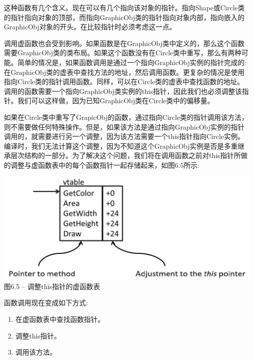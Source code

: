 这种函数有几个含义。现在可以有几个指向该对象的指针。指向Shape或Circle类的指针指向对象的顶部，而指向GraphicObj类的指针指向对象内部，指向嵌入的GraphicObj对象的开头。在比较指针时必须考虑这一点。\par

调用虚函数也会受到影响。如果函数是在GraphicObj类中定义的，那么这个函数需要GraphicObj类的类布局。如果这个函数没有在Circle类中重写，那么有两种可能。简单的情况是，如果函数调用是通过一个指向GraphicObj实例的指针完成的:在GraphicObj类的虚表中查找方法的地址，然后调用函数。更复杂的情况是使用指向Circle类的指针调用函数。同样，可以在Circle类的虚表中查找函数的地址。调用的函数需要一个指向GraphicObj类实例的this指针，因此我们也必须调整该指针。我们可以这样做，因为已知GraphicObj类在Circle类中的偏移量。\par

如果在Circle类中重写了GrapicObj的函数，通过指向Circle类的指针调用该方法，则不需要做任何特殊操作。但是，如果该方法是通过指向GraphicObj实例的指针调用的，就需要进行另一个调整，因为该方法需要一个this指针指向Circle实例。编译时，我们无法计算这个调整，因为不知道这个GraphicObj实例是否是多重继承层次结构的一部分。为了解决这个问题，我们将在调用函数之前对this指针所做的调整与虚函数表中的每个函数指针一起存储起来，如图6.5所示:\par

\hspace*{\fill} \par %
\begin{center}
\includegraphics{content/2/chapter6/images/5.jpg}\\
图6.5 – 调整this指针的虚函数表
\end{center}

函数调用现在变成如下方式:\par

\begin{enumerate}
\item 在虚函数表中查找函数指针。
\item 调整this指针。
\item 调用该方法。
\end{enumerate}

